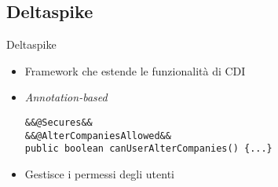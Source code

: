 \subsection{Deltaspike}

\begin{frame}[fragile]{Deltaspike}


\begin{itemize}
\item Framework che estende le funzionalità di CDI
\vspace{0.8em}
\item \textsl{Annotation-based}

\begin{lstlisting}[basicstyle={\tiny\ttfamily}]
&&@Secures&&
&&@AlterCompaniesAllowed&&
public boolean canUserAlterCompanies() {...}
\end{lstlisting}

\item Gestisce i permessi degli utenti
\end{itemize}


\end{frame}

